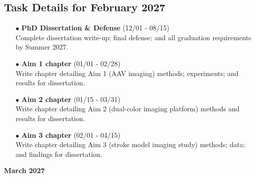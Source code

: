\documentclass[landscape,a4paper]{article}
\begin{document}
\subsection{Task Details for February 2027}
\begin{itemize}[leftmargin=1cm]
    \item[\textcolor{other}{$\bullet$}] \textbf{PhD Dissertation \& Defense} (12/01 - 08/15)\\ Complete dissertation write-up; final defense; and all graduation requirements by Summer 2027.
    \item[\textcolor{other}{$\bullet$}] \textbf{Aim 1 chapter} (01/01 - 02/28)\\ Write chapter detailing Aim 1 (AAV imaging) methods; experiments; and results for dissertation.
    \item[\textcolor{other}{$\bullet$}] \textbf{Aim 2 chapter} (01/15 - 03/31)\\ Write chapter detailing Aim 2 (dual-color imaging platform) methods and results for dissertation.
    \item[\textcolor{other}{$\bullet$}] \textbf{Aim 3 chapter} (02/01 - 04/15)\\ Write chapter detailing Aim 3 (stroke model imaging study) methods; data; and findings for dissertation.
\end{itemize}

\newpage
\pagestyle{empty}

\begin{center}
{\large\textbf{March 2027}}
\end{center}

\vspace{0.5cm}
\end{document}
